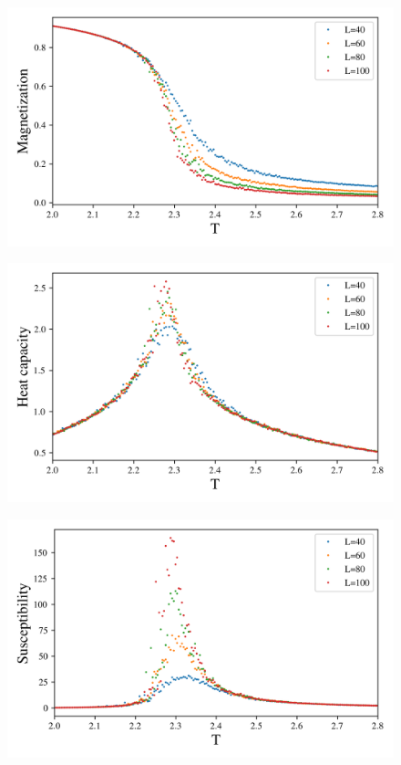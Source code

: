 \begin{figure}[H]
  \centering
  \includegraphics[width=\textwidth]{../figures/phase_Mabs.png}
  \caption{}
  \label{fig:phase_Mabs}
\end{figure}



\begin{figure}[H]
  \centering
  \includegraphics[width=\textwidth]{../figures/phase_cv.png}
  \caption{}
  \label{fig:phase_cv}
\end{figure}


\begin{figure}[H]
  \centering
  \includegraphics[width=\textwidth]{../figures/phase_suscept.png}
  \caption{}
  \label{fig:phase_suscept}
\end{figure}
